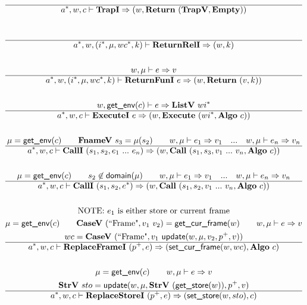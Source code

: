 \begin{gather*}
  \\
  \hline
  \seq{a}, w, c \vdash \trapi \Rightarrow (w, \ret ~ (\trapv, \mt)) \\
%
\newline \\
  \\
  \hline
  \seq{a}, w, (\seq{i}, \mu, wc^*, k) \vdash \returnreli \Rightarrow (w, k) \\
%
\newline \\
  w, \mu \vdash e \Rightarrow v \\
  \hline
  \seq{a}, w, (\seq{i}, \mu, wc^*, k) \vdash \returnfuni ~ e \Rightarrow
  (w, \ret ~ (v, k)) \\
%
\newline \\
  w, \getenv(c) \vdash e \Rightarrow \listv ~ wi^* \\
  \hline
  \seq{a}, w, c \vdash \executei ~ e \Rightarrow
  (w, \exe ~ (wi^*, \algo ~ c)) \\
%
\newline \\
  \mu = \getenv(c) \qquad
  \fnamev ~ s_3 = \mu(s_2) \qquad
  w, \mu \vdash e_1 \Rightarrow v_1 \quad ... \quad
  w, \mu \vdash e_n \Rightarrow v_n \\
  \hline
  \seq{a}, w, c \vdash \calli ~ (s_1, s_2, e_1 ~ ... ~ e_n) \Rightarrow
  (w, \call ~ (s_1, s_3, v_1 ~ ... ~ v_n, \algo ~ c)) \\
%
\newline \\
  \mu = \getenv(c) \qquad
  s_2 \not\in \domain(\mu) \qquad
  w, \mu \vdash e_1 \Rightarrow v_1 \quad ... \quad
  w, \mu \vdash e_n \Rightarrow v_n \\
  \hline
  \seq{a}, w, c \vdash \calli ~ (s_1, s_2, \seq e) \Rightarrow
  (w, \call ~ (s_1, s_2, v_1 ~ ... ~ v_n, \algo ~ c)) \\
%
\newline \\
\text{NOTE: $e_1$ is either store or current frame} \\
  \mu = \getenv(c) \qquad
  \casev ~ (\text{``Frame"}, v_1 ~ v_2) = \getcurframe(w) \qquad
  w, \mu \vdash e \Rightarrow v \\
  wc = \casev ~ (\text{``Frame"}, v_1 ~ \update(w, \mu, v_2, p^+, v)) \\
  \hline
  \seq{a}, w, c \vdash \replaceframei ~ (p^+, e) \Rightarrow
  (\setcurframe(w, wc), \algo ~ c) \\
%
\newline \\
  \mu = \getenv(c) \qquad
  w, \mu \vdash e \Rightarrow v \\
  \strv ~ sto = \update(w, \mu, \strv ~ (\getstore(w)), p^+, v) \\
  \hline
  \seq{a}, w, c \vdash \replacestorei ~ (p^+, e)
  \Rightarrow (\setstore(w, sto), c) \\
\end{gather*}

